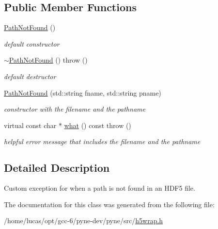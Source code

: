 \subsection*{Public Member Functions}
\begin{DoxyCompactItemize}
\item 
\hyperlink{classh5wrap_1_1_path_not_found_a7b05229fb4f02920732f22622af1f08e}{Path\+Not\+Found} ()\hypertarget{classh5wrap_1_1_path_not_found_a7b05229fb4f02920732f22622af1f08e}{}\label{classh5wrap_1_1_path_not_found_a7b05229fb4f02920732f22622af1f08e}

\begin{DoxyCompactList}\small\item\em default constructor \end{DoxyCompactList}\item 
\hyperlink{classh5wrap_1_1_path_not_found_acf9696ccdfb4a4c63454dbfc1dcde060}{$\sim$\+Path\+Not\+Found} ()  throw ()\hypertarget{classh5wrap_1_1_path_not_found_acf9696ccdfb4a4c63454dbfc1dcde060}{}\label{classh5wrap_1_1_path_not_found_acf9696ccdfb4a4c63454dbfc1dcde060}

\begin{DoxyCompactList}\small\item\em default destructor \end{DoxyCompactList}\item 
\hyperlink{classh5wrap_1_1_path_not_found_aaedd26703acced17206eb8dabd4c5274}{Path\+Not\+Found} (std\+::string fname, std\+::string pname)\hypertarget{classh5wrap_1_1_path_not_found_aaedd26703acced17206eb8dabd4c5274}{}\label{classh5wrap_1_1_path_not_found_aaedd26703acced17206eb8dabd4c5274}

\begin{DoxyCompactList}\small\item\em constructor with the filename and the pathname \end{DoxyCompactList}\item 
virtual const char $\ast$ \hyperlink{classh5wrap_1_1_path_not_found_ad454d14e0f9f44f4357a5c33a7017b88}{what} () const   throw ()\hypertarget{classh5wrap_1_1_path_not_found_ad454d14e0f9f44f4357a5c33a7017b88}{}\label{classh5wrap_1_1_path_not_found_ad454d14e0f9f44f4357a5c33a7017b88}

\begin{DoxyCompactList}\small\item\em helpful error message that includes the filename and the pathname \end{DoxyCompactList}\end{DoxyCompactItemize}


\subsection{Detailed Description}
Custom exception for when a path is not found in an H\+D\+F5 file. 

The documentation for this class was generated from the following file\+:\begin{DoxyCompactItemize}
\item 
/home/lucas/opt/gcc-\/6/pyne-\/dev/pyne/src/\hyperlink{h5wrap_8h}{h5wrap.\+h}\end{DoxyCompactItemize}
